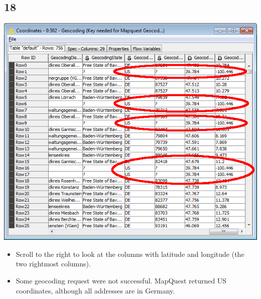 \documentclass{beamer}
\begin{document}
\subsection{18}
\begin{frame}
	\begin{center}
  		\includegraphics[height=0.6\textheight]{18.png}
	\end{center}
	\begin{itemize}
		\item Scroll to the right to look at the columns with latitude and longitude (the two rightmost columns).
		\item Some geocoding request were not successful. MapQuest returned US coordinates, although all addresses are in Germany.
	\end{itemize}
\end{frame}
\end{document}
